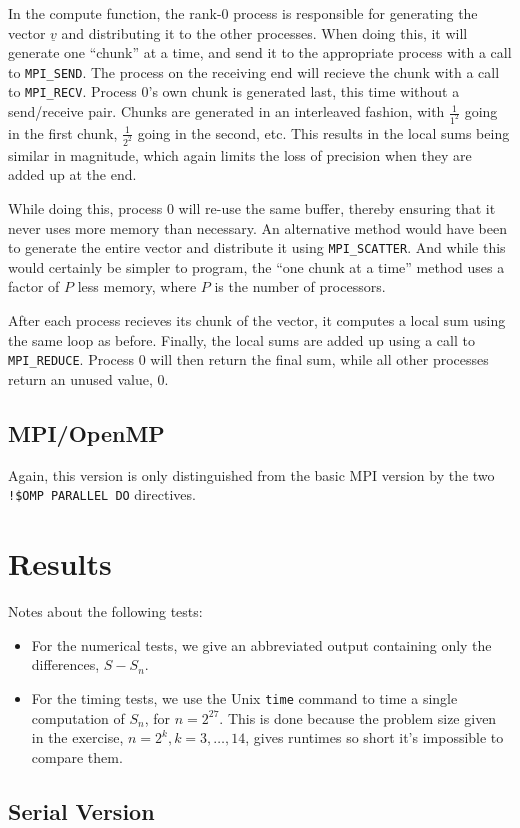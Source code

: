 \documentclass[a4paper, 12pt]{article}
\begin{document}
        In the compute function, the rank-0 process is responsible for generating the vector $\underline{v}$ and distributing it to the other processes. When doing this, it will generate one ``chunk'' at a time, and send it to the appropriate process with a call to \texttt{MPI\_SEND}. The process on the receiving end will recieve the chunk with a call to \texttt{MPI\_RECV}. Process 0's own chunk is generated last, this time without a send/receive pair. Chunks are generated in an interleaved fashion, with $\frac{1}{1^2}$ going in the first chunk, $\frac{1}{2^2}$ going in the second, etc. This results in the local sums being similar in magnitude, which again limits the loss of precision when they are added up at the end.

        While doing this, process 0 will re-use the same buffer, thereby ensuring that it never uses more memory than necessary. An alternative method would have been to generate the entire vector and distribute it using \texttt{MPI\_SCATTER}. And while this would certainly be simpler to program, the ``one chunk at a time'' method uses a factor of $P$ less memory, where $P$ is the number of processors.

        After each process recieves its chunk of the vector, it computes a local sum using the same loop as before. Finally, the local sums are added up using a call to \texttt{MPI\_REDUCE}. Process 0 will then return the final sum, while all other processes return an unused value, 0.

    \subsection{MPI/OpenMP} %
    \label{sub:mpi_openmp}
        Again, this version is only distinguished from the basic MPI version by the two \texttt{!\$OMP PARALLEL DO} directives.

\section{Results} %
\label{sec:results}
    Notes about the following tests: 
    \begin{itemize}
        \item For the numerical tests, we give an abbreviated output containing only the differences, $S - S_n$.
        \item For the timing tests, we use the Unix \texttt{time} command to time a single computation of $S_n$, for $n = 2^{27}$. This is done because the problem size given in the exercise, $n = 2^k, k = 3, \ldots, 14$, gives runtimes so short it's impossible to compare them.
    \end{itemize}

    \subsection{Serial Version} %
    \label{sub:serial_version}
    
\end{document}
